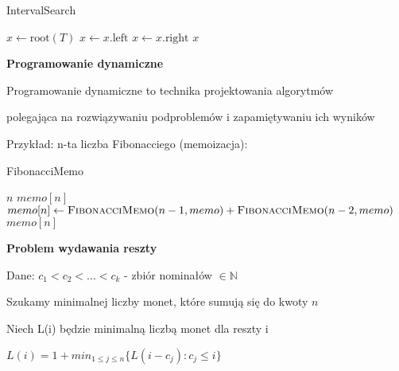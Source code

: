 \documentclass{article}
\begin{document}
    \begin{algorithm}[H]
        \caption{IntervalSearch}\label{alg:interval-search}
        \begin{algorithmic}[1]
                \State $x \gets \text{root}(T)$
                        \State $x \gets x.\text{left}$
                    \Else
                        \State $x \gets x.\text{right}$
                    \EndIf
                \EndWhile
                \State \Return $x$
            \EndProcedure
        \end{algorithmic}
    \end{algorithm}
    \newpage
    \textbf{Programowanie dynamiczne} \par
    Programowanie dynamiczne to technika projektowania algorytmów \par
    polegająca na rozwiązywaniu podproblemów i zapamiętywaniu ich wyników \par
    Przykład: n-ta liczba Fibonacciego (memoizacja): \par
    \begin{algorithm}[H]
        \caption{FibonacciMemo}\label{alg:fibonacci-memo}
        \begin{algorithmic}[1]
                    \State \Return $n$
                \EndIf
                    \State \Return $memo[n]$
                \EndIf
                \State $memo[n] \gets \Call{FibonacciMemo}{n - 1, memo} + \Call{FibonacciMemo}{n - 2, memo}$
                \State \Return $memo[n]$
            \EndProcedure
        \end{algorithmic}
    \end{algorithm}
    \vspace{1\baselineskip}
    \textbf{Problem wydawania reszty} \par
    Dane: $c_1 < c_2 < ... < c_k$ - zbiór nominałów $\in \mathbb{N}$ \par
    Szukamy minimalnej liczby monet, które sumują się do kwoty $n$ \par
    Niech L(i) będzie minimalną liczbą monet dla reszty i \par
    $L(i) = 1 + min_{1 \leq j \leq n} \{L(i - c_j): c_j \leq i\}$ \par
\end{document}
